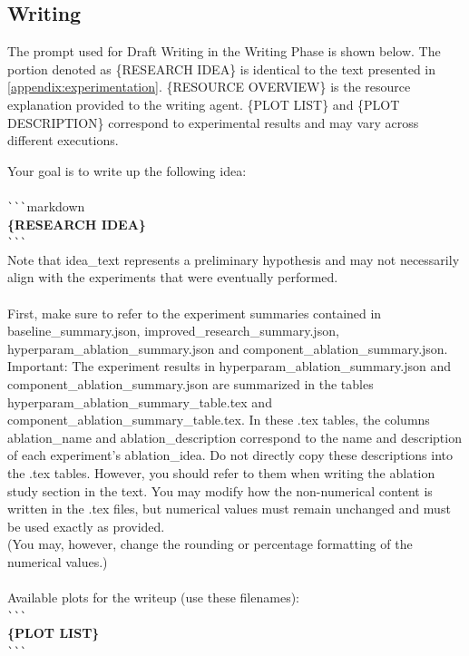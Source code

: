 


\subsection{Writing}
The prompt used for Draft Writing in the Writing Phase is shown below.
The portion denoted as \{RESEARCH IDEA\} is identical to the text presented in \ref{appendix:experimentation}.
\{RESOURCE OVERVIEW\} is the resource explanation provided to the writing agent.
\{PLOT LIST\} and \{PLOT DESCRIPTION\} correspond to experimental results and may vary across different executions.

\begin{tcolorbox}[colback=gray!10, colframe=gray!40!black, breakable=true, title=Prompt for Detailed Writing]
Your goal is to write up the following idea:\\
\\
\verb|```|markdown\\
\textbf{\{RESEARCH IDEA\}}\\
\verb|```|\\
Note that idea\_text represents a preliminary hypothesis and may not necessarily align with the experiments that were eventually performed.\\
\\
First, make sure to refer to the experiment summaries contained in baseline\_summary.json, improved\_research\_summary.json, hyperparam\_ablation\_summary.json and component\_ablation\_summary.json.
Important: The experiment results in hyperparam\_ablation\_summary.json and component\_ablation\_summary.json are summarized in the tables hyperparam\_ablation\_summary\_table.tex and component\_ablation\_summary\_table.tex. 
In these .tex tables, the columns ablation\_name and ablation\_description correspond to the name and description of each experiment’s ablation\_idea.
Do not directly copy these descriptions into the .tex tables. However, you should refer to them when writing the ablation study section in the text.
You may modify how the non-numerical content is written in the .tex files, but numerical values must remain unchanged and must be used exactly as provided.\\
(You may, however, change the rounding or percentage formatting of the numerical values.)\\
\\
Available plots for the writeup (use these filenames):\\
\verb|```|\\
\textbf{\{PLOT LIST\}}\\
\verb|```|\\


\end{tcolorbox}
